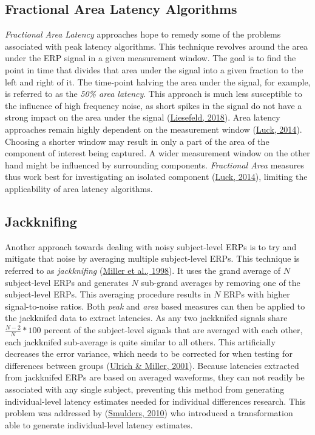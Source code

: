 \documentclass[
  man]{apa7}
\begin{document}
\hypertarget{fractional-area-latency-algorithms}{%
\subsection{Fractional Area Latency Algorithms}\label{fractional-area-latency-algorithms}}

\emph{Fractional Area Latency} approaches hope to remedy some of the problems associated with peak latency algorithms. This technique revolves around the area under the ERP signal in a given measurement window. The goal is to find the point in time that divides that area under the signal into a given fraction to the left and right of it. The time-point halving the area under the signal, for example, is referred to as the \emph{50\% area latency}. This approach is much less susceptible to the influence of high frequency noise, as short spikes in the signal do not have a strong impact on the area under the signal (\protect\hyperlink{ref-liesefeld2018estimating}{Liesefeld, 2018}). Area latency approaches remain highly dependent on the measurement window (\protect\hyperlink{ref-luck2014introduction}{Luck, 2014}). Choosing a shorter window may result in only a part of the area of the component of interest being captured. A wider measurement window on the other hand might be influenced by surrounding components. \emph{Fractional Area} measures thus work best for investigating an isolated component (\protect\hyperlink{ref-luck2014introduction}{Luck, 2014}), limiting the applicability of area latency algorithms.

\hypertarget{jackknifing}{%
\subsection{Jackknifing}\label{jackknifing}}

Another approach towards dealing with noisy subject-level ERPs is to try and mitigate that noise by averaging multiple subject-level ERPs. This technique is referred to as \emph{jackknifing} (\protect\hyperlink{ref-miller1998jackknife}{Miller et al., 1998}). It uses the grand average of \(N\) subject-level ERPs and generates \(N\) sub-grand averages by removing one of the subject-level ERPs. This averaging procedure results in \(N\) ERPs with higher signal-to-noise ratios. Both \emph{peak} and \emph{area} based measures can then be applied to the jackknifed data to extract latencies. As any two jackknifed signals share \(\frac{N-2}{N} * 100\) percent of the subject-level signals that are averaged with each other, each jackknifed sub-average is quite similar to all others. This artificially decreases the error variance, which needs to be corrected for when testing for differences between groups (\protect\hyperlink{ref-ulrich2001using}{Ulrich \& Miller, 2001}). Because latencies extracted from jackknifed ERPs are based on averaged waveforms, they can not readily be associated with any single subject, preventing this method from generating individual-level latency estimates needed for individual differences research. This problem was addressed by (\protect\hyperlink{ref-smulders2010simplifying}{Smulders, 2010}) who introduced a transformation able to generate individual-level latency estimates.
\end{document}
